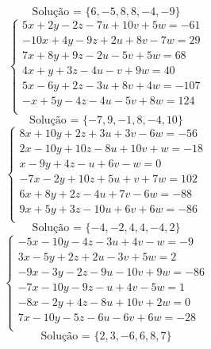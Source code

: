 \documentclass[12pt,oneside,a4paper]{article}
\begin{document}
\begin{equation*}
\text{Solução = }\{6,-5,8,8,-4,-9\}
\end{equation*}
\vspace{\baselineskip}
\begin{equation*}
\begin{cases}
5x+2y-2z-7u+10v+5w=-61 \\
-10x+4y-9z+2u+8v-7w=29 \\
7x+8y+9z-2u-5v+5w=68 \\
4x+y+3z-4u-v+9w=40 \\
5x-6y+2z-3u+8v+4w=-107 \\
-x+5y-4z-4u-5v+8w=124 \\
\end{cases}
\end{equation*}
\begin{equation*}
\text{Solução = }\{-7,9,-1,8,-4,10\}
\end{equation*}
\vspace{\baselineskip}
\begin{equation*}
\begin{cases}
8x+10y+2z+3u+3v-6w=-56 \\
2x-10y+10z-8u+10v+w=-18 \\
x-9y+4z-u+6v-w=0 \\
-7x-2y+10z+5u+v+7w=102 \\
6x+8y+2z-4u+7v-6w=-88 \\
9x+5y+3z-10u+6v+6w=-86 \\
\end{cases}
\end{equation*}
\begin{equation*}
\text{Solução = }\{-4,-2,4,4,-4,2\}
\end{equation*}
\vspace{\baselineskip}
\begin{equation*}
\begin{cases}
-5x-10y-4z-3u+4v-w=-9 \\
3x-5y+2z+2u-3v+5w=2 \\
-9x-3y-2z-9u-10v+9w=-86 \\
-7x-10y-9z-u+4v-5w=1 \\
-8x-2y+4z-8u+10v+2w=0 \\
7x-10y-5z-6u-6v+6w=-28 \\
\end{cases}
\end{equation*}
\begin{equation*}
\text{Solução = }\{2,3,-6,6,8,7\}
\end{equation*}
\end{document}
